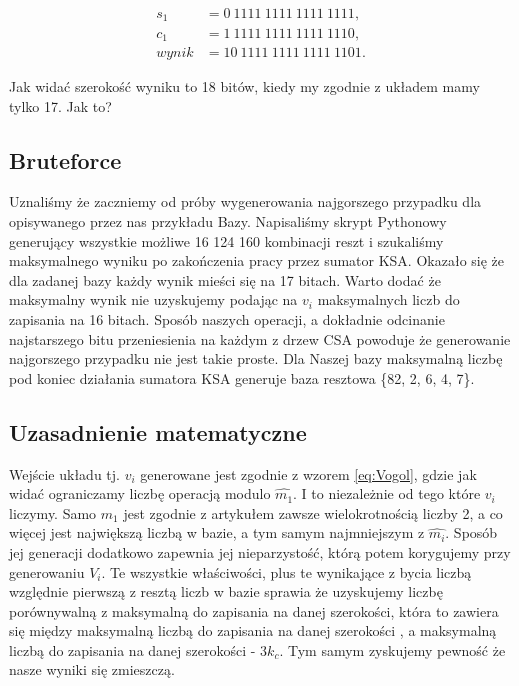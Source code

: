 \documentclass[comsoc]{IEEEtran}
\begin{document}
	\begin{equation} \label{eq:csaMaksKSA}
	\begin{aligned}
	s_{1}& = 0~1111~1111~1111~1111,\\
	c_{1}& = 1~1111~1111~1111~1110,\\
	wynik& = 10~1111~1111~1111~1101.
	\end{aligned}
	\end{equation}
	
	Jak widać szerokość wyniku to 18 bitów, kiedy my zgodnie z układem mamy tylko 17. Jak to?
	
	\subsection{Bruteforce}
	
	Uznaliśmy że zaczniemy od próby wygenerowania najgorszego przypadku dla opisywanego przez nas przykładu Bazy. Napisaliśmy skrypt Pythonowy generujący wszystkie możliwe 16 124 160 kombinacji reszt i szukaliśmy maksymalnego wyniku po zakończenia pracy przez sumator KSA. Okazało się że dla zadanej bazy każdy wynik mieści się na 17 bitach. Warto dodać że maksymalny wynik nie uzyskujemy podając na $v_{i}$ maksymalnych liczb do zapisania na 16 bitach. Sposób naszych operacji, a dokładnie odcinanie najstarszego bitu przeniesienia na każdym z drzew CSA powoduje że generowanie najgorszego przypadku nie jest takie proste. Dla Naszej bazy maksymalną liczbę pod koniec działania sumatora KSA generuje baza resztowa \{82, 2, 6, 4, 7\}.
	
	\subsection{Uzasadnienie matematyczne}
	
	Wejście układu tj. $v_{i}$ generowane jest zgodnie z wzorem \ref{eq:Vogol}, gdzie jak widać ograniczamy liczbę operacją modulo $\hat{m_{1}}$. I to niezależnie od tego które $v_{i}$ liczymy. Samo $m_{1}$ jest zgodnie z artykułem zawsze wielokrotnością liczby 2, a co więcej jest największą liczbą w bazie, a tym samym najmniejszym z $\hat{m_{i}}$. Sposób jej generacji dodatkowo zapewnia jej nieparzystość, którą potem korygujemy przy generowaniu $V_{i}$. Te wszystkie właściwości, plus te wynikające z bycia liczbą względnie pierwszą z resztą liczb w bazie sprawia że uzyskujemy liczbę porównywalną z maksymalną do zapisania na danej szerokości, która to zawiera się między maksymalną liczbą do zapisania na danej szerokości , a maksymalną liczbą do zapisania na danej szerokości - $3k_{c}$. Tym samym zyskujemy pewność że nasze wyniki się zmieszczą.
	
\end{document}
